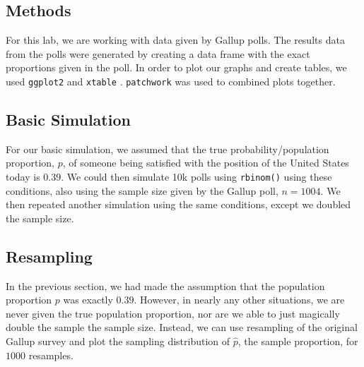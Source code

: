 \documentclass{article}\usepackage[]{graphicx}\usepackage[]{xcolor}
\begin{document}
\begin{multicols}{2}
% 
% 


\section{Methods}
For this lab, we are working with data given by Gallup polls. The results data from the polls were generated by creating a data frame with the exact proportions given in the poll. In order to plot our graphs and create tables, we used \texttt{ggplot2} \citep{ggplot2} and \texttt{xtable} \citep{xtable}. \texttt{patchwork} \citep{patchwork} was used to combined plots together. 

\subsection{Basic Simulation}
For our basic simulation, we assumed that the true probability/population proportion, $p$, of someone being satisfied with the position of the United States today is $0.39$. We could then simulate 10k polls using \verb|rbinom()| using these conditions, also using the sample size given by the Gallup poll, $n=1004$. We then repeated another simulation using the same conditions, except we doubled the sample size. 

\subsection{Resampling}
In the previous section, we had made the assumption that the population proportion $p$ was exactly $0.39$. However, in nearly any other situations, we are never given the true population proportion, nor are we able to just magically double the sample the sample size. Instead, we can use resampling of the original Gallup survey and plot the sampling distribution of $\hat{p}$, the sample proportion, for $1000$ resamples. 

\end{multicols}
\end{document}
